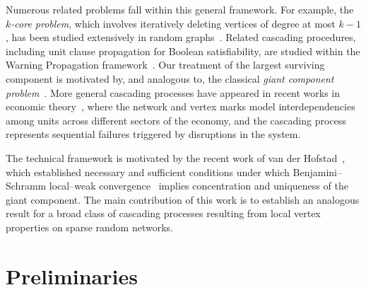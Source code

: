 \documentclass[11pt]{article}
\theoremstyle{plain}
\begin{document}
Numerous related problems fall within this general framework. For example, the \emph{$k$-core problem}, which involves iteratively deleting vertices of degree at most $k-1$, has been studied extensively in random graphs~\cite{pittel1996sudden,riordan2008k,fernholzgiant,janson2008asymptotic,Luc91}. 
Related cascading procedures, including unit clause propagation for Boolean satisfiability, are studied within the Warning Propagation framework~\cite{cooley2021warning}.
Our treatment of the largest surviving component is motivated by, and analogous to, the classical \emph{giant component problem}~\cite{Draief;Massoulie:2009,Jackson:2010,Hofstad:2017,Hofs24}.
More general cascading processes have appeared in recent works in economic theory~\cite{EGL22,elliott2022networks}, where the network and vertex marks model interdependencies among units across different sectors of the economy, and the cascading process represents sequential failures triggered by disruptions in the system.




The technical framework is motivated by the recent work of van der Hofstad~\cite{van2021giant}, which established necessary and sufficient conditions under which Benjamini--Schramm local--weak convergence~\cite{BenSch01,AldSte04} implies concentration and uniqueness of the giant component. The main contribution of this work is to establish an analogous result for a broad class of cascading processes resulting from local vertex properties on sparse random networks.



\section{Preliminaries}
\end{document}

